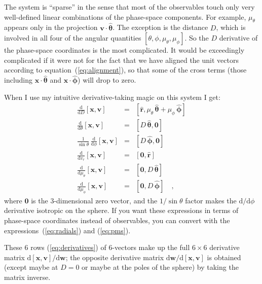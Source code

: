 \documentclass[12pt,letterpaper]{article}
\newcommand{\mvector}[1]{\boldsymbol{#1}}
\newcommand{\vv}{\mvector{v}}
\newcommand{\vx}{\mvector{x}}
\newcommand{\observable}{\mvector{w}}
\newcommand{\zero}{\mvector{0}}
\newcommand{\vhat}[1]{\mvector{\hat{#1}}}
\newcommand{\rhat}{\vhat{r}}
\newcommand{\thetahat}{\vhat{\theta}}
\newcommand{\phihat}{\vhat{\phi}}
\newcommand{\dd}{\mathrm{d}}
\begin{document}
The system is ``sparse'' in the sense that most of the observables
touch only very well-defined linear combinations of the phase-space
components.  For example, $\mu_{\theta}$ appears only in the
projection $\vv\cdot\thetahat$.  The exception is the distance $D$,
which is involved in all four of the angular quantities $[\theta,
  \phi, \mu_{\theta}, \mu_{\phi}]$.  So the $D$ derivative of the
phase-space coordinates is the most complicated.  It would be
exceedingly complicated if it were not for the fact that we have
aligned the unit vectors according to equation~(\ref{eq:alignment}),
so that some of the cross terms (those including $\vx\cdot\thetahat$
and $\vx\cdot\phihat$) will drop to zero.

When I use my intuitive derivative-taking magic on this system I get:
\begin{eqnarray}\displaystyle
\frac{\dd}{\dd D}[\vx, \vv] &=& [\rhat, \mu_\theta\,\thetahat+\mu_\phi\,\phihat]
\nonumber\\
\frac{\dd}{\dd \theta}[\vx, \vv] &=& [D\,\thetahat, \zero]
\nonumber\\
\frac{1}{\sin\theta}\,\frac{\dd}{\dd \phi}[\vx, \vv] &=& [D\,\phihat, \zero]
\nonumber\\
\frac{\dd}{\dd v_r}[\vx, \vv] &=& [\zero, \rhat]
\nonumber\\
\frac{\dd}{\dd \mu_\theta}[\vx, \vv] &=& [\zero, D\,\thetahat]
\nonumber\\
\frac{\dd}{\dd \mu_\phi}[\vx, \vv] &=& [\zero, D\,\phihat]
\quad ,\label{eq:derivatives}
\end{eqnarray}
where $\zero$ is the 3-dimensional zero vector, and the $1/\sin\theta$
factor makes the $\dd /\dd\phi$ derivative isotropic on the sphere.
If you want these expressions in terms of phase-space coordinates
instead of observables, you can convert with the
expressions~(\ref{eq:radials}) and (\ref{eq:pms}).

These 6 rows (\ref{eq:derivatives}) of 6-vectors make up the full
$6\times 6$ derivative matrix $\dd [\vx, \vv] / \dd\observable$; the
opposite derivative matrix $\dd\observable / \dd [\vx,\vv]$ is
obtained (except maybe at $D=0$ or maybe at the poles of the sphere)
by taking the matrix inverse.
\end{document}
